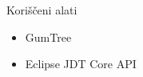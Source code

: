 \begin{frame}{Kori\v{s}\v{c}eni alati}
    \begin{itemize}
        \item GumTree
        \item Eclipse JDT Core API
    \end{itemize}
\end{frame}
